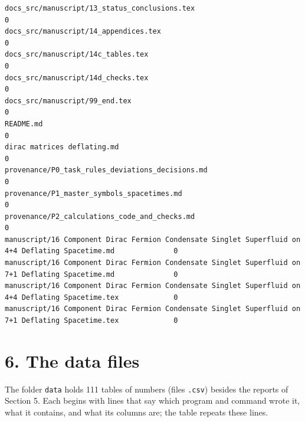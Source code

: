 \documentclass[
  10pt,
]{article}
\begin{document}
\begin{verbatim}
docs_src/manuscript/13_status_conclusions.tex                                                                  0
docs_src/manuscript/14_appendices.tex                                                                          0
docs_src/manuscript/14c_tables.tex                                                                             0
docs_src/manuscript/14d_checks.tex                                                                             0
docs_src/manuscript/99_end.tex                                                                                 0
README.md                                                                                                      0
dirac matrices deflating.md                                                                                    0
provenance/P0_task_rules_deviations_decisions.md                                                               0
provenance/P1_master_symbols_spacetimes.md                                                                     0
provenance/P2_calculations_code_and_checks.md                                                                  0
manuscript/16 Component Dirac Fermion Condensate Singlet Superfluid on 4+4 Deflating Spacetime.md              0
manuscript/16 Component Dirac Fermion Condensate Singlet Superfluid on 7+1 Deflating Spacetime.md              0
manuscript/16 Component Dirac Fermion Condensate Singlet Superfluid on 4+4 Deflating Spacetime.tex             0
manuscript/16 Component Dirac Fermion Condensate Singlet Superfluid on 7+1 Deflating Spacetime.tex             0
\end{verbatim}

\hypertarget{the-data-files}{%
\section{6. The data files}\label{the-data-files}}

The folder \texttt{data} holds 111 tables of numbers (files
\texttt{.csv}) besides the reports of Section 5. Each begins with lines
that say which program and command wrote it, what it contains, and what
its columns are; the table repeats these lines.
\end{document}
